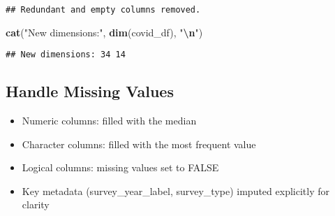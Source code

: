 \documentclass[
]{article}
\newenvironment{Shaded}{\begin{snugshade}}{\end{snugshade}}
\newcommand{\FunctionTok}[1]{\textcolor[rgb]{0.13,0.29,0.53}{\textbf{#1}}}
\newcommand{\NormalTok}[1]{#1}
\newcommand{\SpecialCharTok}[1]{\textcolor[rgb]{0.81,0.36,0.00}{\textbf{#1}}}
\newcommand{\StringTok}[1]{\textcolor[rgb]{0.31,0.60,0.02}{#1}}
\begin{document}
\begin{verbatim}
## Redundant and empty columns removed.
\end{verbatim}

\begin{Shaded}
\begin{Highlighting}[]
\FunctionTok{cat}\NormalTok{(}\StringTok{"New dimensions:"}\NormalTok{, }\FunctionTok{dim}\NormalTok{(covid\_df), }\StringTok{"}\SpecialCharTok{\textbackslash{}n}\StringTok{"}\NormalTok{)}
\end{Highlighting}
\end{Shaded}

\begin{verbatim}
## New dimensions: 34 14
\end{verbatim}

\subsection{Handle Missing Values}\label{handle-missing-values}

\begin{itemize}
\item
  Numeric columns: filled with the median
\item
  Character columns: filled with the most frequent value
\item
  Logical columns: missing values set to FALSE
\item
  Key metadata (survey\_year\_label, survey\_type) imputed explicitly
  for clarity
\end{itemize}
\end{document}
